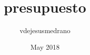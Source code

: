 \documentclass{article}
\title{presupuesto}
\author{vdejesusmedrano}
\date{May 2018}
\begin{document}

\end{document}
